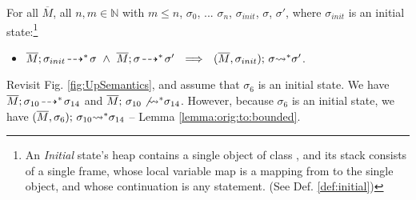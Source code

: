 { \begin{lemma}
\label{lemma:orig:to:bounded}
For all $\overline M$, all $n,m\in \mathbb{N}$ with $m\leq n$, $\sigma_0$, ... $\sigma_n$,  $\sigma_{init}$, $\sigma$, $\sigma'$, where
$\sigma_{init}$ is an initial state:\footnote{An \emph{Initial} state's heap contains a single object of class , and
its  stack   consists of a single frame, whose local variable map is a mapping from  to the single object, and whose continuation is  any statement.
(See Def. \ref{def:initial})}
\begin{itemize} %
\item 
\label{otbTwo}
$\leadstoOrigStar {\Mtwo} {\sigma_{init}}  {\sigma}\ \wedge\ \leadstoOrigStar {\Mtwo} {\sigma}  {\sigma'}\ \ \Longrightarrow\ \  \leadstoBoundedStarThree {\Mtwo} {\sigma} {\sigma_{init}} {\sigma'}$.
\end{itemize}
\end{lemma}
 



{Revisit  Fig. \ref{fig:UpSemantics}, and assume that $\sigma_6$ is an initial state.
We have  $\leadstoOrigStar {\Mtwo} {\sigma_{10}}  {\sigma_{14}}$ and $ \notLeadstoBoundedStar {\Mtwo}  {\sigma_{10}} {\sigma_{14}}$.
However, because $\sigma_6$ is an initial state, we have $\leadstoBoundedStarThree {\Mtwo}  {\sigma_{10}} {\sigma_{6}}  {\sigma_{14}}$ -- \cf Lemma \ref{lemma:orig:to:bounded}.
}}

